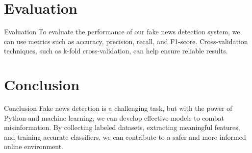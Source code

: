 \documentclass{beamer}
\begin{document}
\section{Evaluation}
\begin{frame}{Evaluation}
  To evaluate the performance of our fake news detection system, we can use metrics such as accuracy, precision, recall, and F1-score. Cross-validation techniques, such as k-fold cross-validation, can help ensure reliable results.
\end{frame}

\section{Conclusion}
\begin{frame}{Conclusion}
  Fake news detection is a challenging task, but with the power of Python and machine learning, we can develop effective models to combat misinformation. By collecting labeled datasets, extracting meaningful features, and training accurate classifiers, we can contribute to a safer and more informed online environment.
\end{frame}
\end{document}
